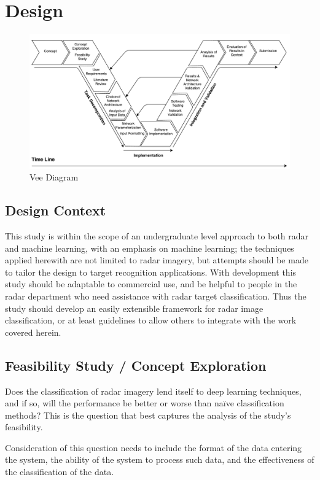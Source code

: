 \chapter{Design}


\begin{figure}[]
\centering
\includegraphics[width=\textwidth]{figures/vee_diagram}
\caption{Vee Diagram}
\label{fig:vee_diagram}
\centering
\end{figure}



\section{Design Context}
This study is within the scope of an undergraduate level approach to both radar and machine learning, with an emphasis on machine learning; the techniques applied herewith are not limited to radar imagery, but attempts should be made to tailor the design to target recognition applications. With development this study should be adaptable to commercial use, and be helpful to people in the radar department who need assistance with radar target classification. Thus the study should develop an easily extensible framework for radar image classification, or at least guidelines to allow others to integrate with the work covered herein.


\section{Feasibility Study / Concept Exploration}
Does the classification of radar imagery lend itself to deep learning techniques, and if so, will the performance be better or worse than na{\"i}ve classification methods? This is the question that best captures the analysis of the study's feasibility.

Consideration of this question needs to include the format of the data entering the system, the ability of the system to process such data, and the effectiveness of the classification of the data.

